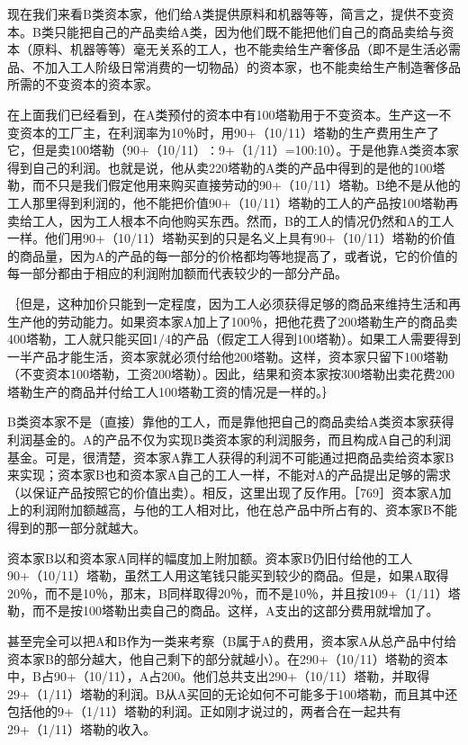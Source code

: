 现在我们来看B类资本家，他们给A类提供原料和机器等等，简言之，提供不变资本。B类只能把自己的产品卖给A类，因为他们既不能把他们自己的商品卖给与资本（原料、机器等等）毫无关系的工人，也不能卖给生产奢侈品（即不是生活必需品、不加入工人阶级日常消费的一切物品）的资本家，也不能卖给生产制造奢侈品所需的不变资本的资本家。

在上面我们已经看到，在A类预付的资本中有100塔勒用于不变资本。生产这一不变资本的工厂主，在利润率为10％时，用90+（10/11）塔勒的生产费用生产了它，但是卖100塔勒（90+（10/11）∶9+（1/11）=100:10）。于是他靠A类资本家得到自己的利润。也就是说，他从卖220塔勒的A类的产品中得到的是他的100塔勒，而不只是我们假定他用来购买直接劳动的90+（10/11）塔勒。B绝不是从他的工人那里得到利润的，他不能把价值90+（10/11）塔勒的工人的产品按100塔勒再卖给工人，因为工人根本不向他购买东西。然而，B的工人的情况仍然和A的工人一样。他们用90+（10/11）塔勒买到的只是名义上具有90+（10/11）塔勒的价值的商品量，因为A的产品的每一部分的价格都均等地提高了，或者说，它的价值的每一部分都由于相应的利润附加额而代表较少的一部分产品。

｛但是，这种加价只能到一定程度，因为工人必须获得足够的商品来维持生活和再生产他的劳动能力。如果资本家A加上了100％，把他花费了200塔勒生产的商品卖400塔勒，工人就只能买回1/4的产品（假定工人得到100塔勒）。如果工人需要得到一半产品才能生活，资本家就必须付给他200塔勒。这样，资本家只留下100塔勒（不变资本100塔勒，工资200塔勒）。因此，结果和资本家按300塔勒出卖花费200塔勒生产的商品并付给工人100塔勒工资的情况是一样的。｝

B类资本家不是（直接）靠他的工人，而是靠他把自己的商品卖给A类资本家获得利润基金的。A的产品不仅为实现B类资本家的利润服务，而且构成A自己的利润基金。可是，很清楚，资本家A靠工人获得的利润不可能通过把商品卖给资本家B来实现；资本家B也和资本家A自己的工人一样，不能对A的产品提出足够的需求（以保证产品按照它的价值出卖）。相反，这里出现了反作用。［769］资本家A加上的利润附加额越高，与他的工人相对比，他在总产品中所占有的、资本家B不能得到的那一部分就越大。

资本家B以和资本家A同样的幅度加上附加额。资本家B仍旧付给他的工人90+（10/11）塔勒，虽然工人用这笔钱只能买到较少的商品。但是，如果A取得20％，而不是10％，那末，B同样取得20％，而不是10％，并且按109+（1/11）塔勒，而不是按100塔勒出卖自己的商品。这样，A支出的这部分费用就增加了。

甚至完全可以把A和B作为一类来考察（B属于A的费用，资本家A从总产品中付给资本家B的部分越大，他自己剩下的部分就越小）。在290+（10/11）塔勒的资本中，B占90+（10/11），A占200。他们总共支出290+（10/11）塔勒，并取得29+（1/11）塔勒的利润。B从A买回的无论如何不可能多于100塔勒，而且其中还包括他的9+（1/11）塔勒的利润。正如刚才说过的，两者合在一起共有29+（1/11）塔勒的收入。

